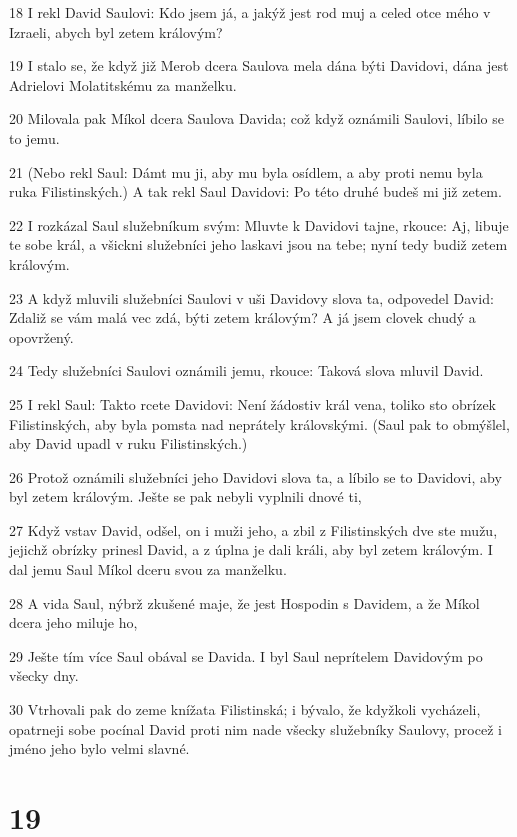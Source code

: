 \par 18 I rekl David Saulovi: Kdo jsem já, a jakýž jest rod muj a celed otce mého v Izraeli, abych byl zetem královým?
\par 19 I stalo se, že když již Merob dcera Saulova mela dána býti Davidovi, dána jest Adrielovi Molatitskému za manželku.
\par 20 Milovala pak Míkol dcera Saulova Davida; což když oznámili Saulovi, líbilo se to jemu.
\par 21 (Nebo rekl Saul: Dámt mu ji, aby mu byla osídlem, a aby proti nemu byla ruka Filistinských.) A tak rekl Saul Davidovi: Po této druhé budeš mi již zetem.
\par 22 I rozkázal Saul služebníkum svým: Mluvte k Davidovi tajne, rkouce: Aj, libuje te sobe král, a všickni služebníci jeho laskavi jsou na tebe; nyní tedy budiž zetem královým.
\par 23 A když mluvili služebníci Saulovi v uši Davidovy slova ta, odpovedel David: Zdaliž se vám malá vec zdá, býti zetem královým? A já jsem clovek chudý a opovržený.
\par 24 Tedy služebníci Saulovi oznámili jemu, rkouce: Taková slova mluvil David.
\par 25 I rekl Saul: Takto rcete Davidovi: Není žádostiv král vena, toliko sto obrízek Filistinských, aby byla pomsta nad neprátely královskými. (Saul pak to obmýšlel, aby David upadl v ruku Filistinských.)
\par 26 Protož oznámili služebníci jeho Davidovi slova ta, a líbilo se to Davidovi, aby byl zetem královým. Ješte se pak nebyli vyplnili dnové ti,
\par 27 Když vstav David, odšel, on i muži jeho, a zbil z Filistinských dve ste mužu, jejichž obrízky prinesl David, a z úplna je dali králi, aby byl zetem královým. I dal jemu Saul Míkol dceru svou za manželku.
\par 28 A vida Saul, nýbrž zkušené maje, že jest Hospodin s Davidem, a že Míkol dcera jeho miluje ho,
\par 29 Ješte tím více Saul obával se Davida. I byl Saul neprítelem Davidovým po všecky dny.
\par 30 Vtrhovali pak do zeme knížata Filistinská; i bývalo, že kdyžkoli vycházeli, opatrneji sobe pocínal David proti nim nade všecky služebníky Saulovy, procež i jméno jeho bylo velmi slavné.

\chapter{19}

